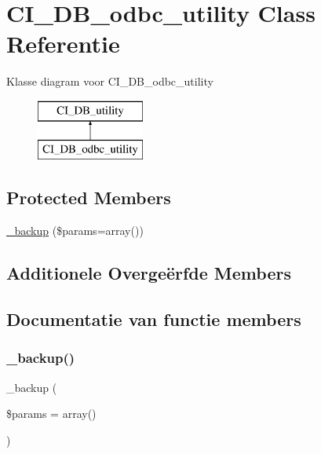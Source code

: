 \hypertarget{class_c_i___d_b__odbc__utility}{}\section{C\+I\+\_\+\+D\+B\+\_\+odbc\+\_\+utility Class Referentie}
\label{class_c_i___d_b__odbc__utility}
Klasse diagram voor C\+I\+\_\+\+D\+B\+\_\+odbc\+\_\+utility\begin{figure}[H]
\begin{center}
\leavevmode
\includegraphics[height=2.000000cm]{class_c_i___d_b__odbc__utility}
\end{center}
\end{figure}
\subsection*{Protected Members}
\begin{DoxyCompactItemize}
\item 
\mbox{\hyperlink{class_c_i___d_b__odbc__utility_a30f3053d2c82e7562349924363507afa}{\+\_\+backup}} (\$params=array())
\end{DoxyCompactItemize}
\subsection*{Additionele Overge\"{e}rfde Members}


\subsection{Documentatie van functie members}
\mbox{\label{class_c_i___d_b__odbc__utility_a30f3053d2c82e7562349924363507afa}} 
\subsubsection{\texorpdfstring{\_backup()}{\_backup()}}
{\footnotesize\ttfamily \+\_\+backup (\begin{DoxyParamCaption}\item[{}]{\$params = {\ttfamily array()} }\end{DoxyParamCaption})\hspace{0.3cm}{\ttfamily [protected]}}

